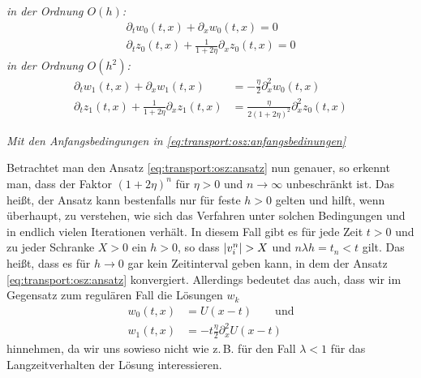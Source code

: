 \vspace{0.4cm}
\noindent \emph{in der Ordnung $O(h)$:}
\begin{align}
\partial_t w_0(t, x) + \partial_x w_0(t, x) = 0 \label{eq:transport:osz:oh_A}\\
\partial_t z_0(t, x) + \frac {1} {1 + 2\eta} \partial_x z_0(t, x) = 0 \label{eq:transport:osz:oh_B}
\end{align}
\vspace{0.4cm}
\noindent \emph{in der Ordnung $O(h^2)$:}
\begin{align}\label{eq:transport:osz:oh2_A}
\partial_t w_1(t, x) + \partial_x w_1(t, x) &= - \frac {\eta}{2} \partial^2_x w_0(t, x)\\
\partial_t z_1(t, x) + \frac{1}{1 + 2 \eta} \partial_x z_1(t, x) &= \frac{\eta}{2 (1 + 2 \eta)^2} \partial^2_x z_0(t, x) \label{eq:transport:osz:oh2_B}
\end{align}

\noindent \emph{Mit den Anfangsbedingungen in \eqref{eq:transport:osz:anfangsbedinungen}}

\vspace{0.4cm}
Betrachtet man den Ansatz \eqref{eq:transport:osz:ansatz} nun genauer, so erkennt man, dass der Faktor $(1 + 2 \eta)^n$ für $\eta > 0$ und $n \to \infty$ unbeschränkt ist.
Das heißt, der Ansatz kann bestenfalls nur für feste $h > 0$ gelten und hilft, wenn überhaupt, zu verstehen, wie sich das Verfahren unter solchen Bedingungen und in endlich vielen Iterationen verhält.
In diesem Fall gibt es für jede Zeit $t > 0$ und zu jeder Schranke $X > 0$ ein $h > 0$, so dass $\left| v^n_i \right| > X$ und $n \lambda h = t_n < t$ gilt.
Das heißt, dass es für $h \to 0$ gar kein Zeitinterval geben kann, in dem der Ansatz \eqref{eq:transport:osz:ansatz} konvergiert. 
Allerdings bedeutet das auch, dass wir im Gegensatz zum regulären Fall die Lösungen $w_k$
\begin{align}\label{eq:transport:osz:wk_loesungen}
w_0(t, x) &= U(x - t) \qquad \text{und}\\
w_1(t, x) &= - t \frac{\eta} 2 \partial^2_x U(x - t)
\end{align}
hinnehmen, da wir uns sowieso nicht wie z.\,B. für den Fall $\lambda < 1$ für das Langzeitverhalten der Lösung interessieren.


